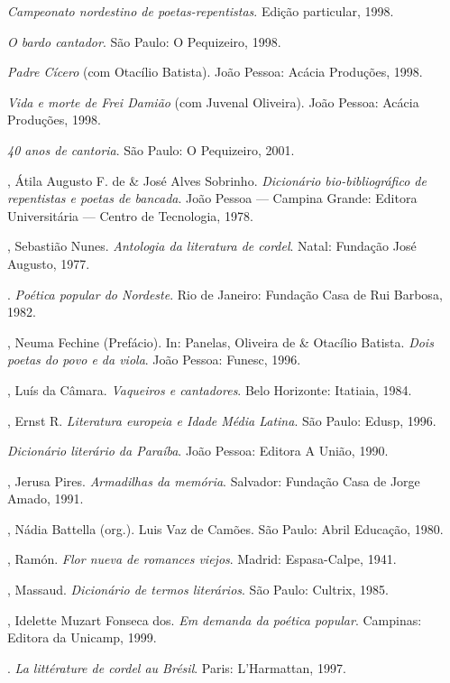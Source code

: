 \begin{bibliografia}[]
\tit{}\textit{Campeonato nordestino de poetas-repentistas}. Edição particular, 1998.

\tit{}\textit{O bardo cantador}. São Paulo: O Pequizeiro, 1998.

\tit{}\textit{Padre Cícero }(com Otacílio Batista). João Pessoa: Acácia Produções, 1998.

\tit{}\textit{Vida e morte de Frei Damião} (com Juvenal Oliveira). João Pessoa: Acácia Produções, 1998.

\tit{}\textit{40 anos de cantoria}. São Paulo: O Pequizeiro, 2001.


\bigskip
{}


, Átila Augusto F. de \& José Alves Sobrinho. \textit{Dicionário bio-bibliográfico de repentistas e poetas de
bancada}. João Pessoa --- Campina Grande: Editora Universitária --- Centro de Tecnologia, 1978.

, Sebastião Nunes. \textit{Antologia da literatura de cordel}. Natal: Fundação José Augusto, 1977.

\titidem. \textit{Poética popular do Nordeste}.  Rio de Janeiro: Fundação Casa de Rui Barbosa, 1982.

, Neuma Fechine (Prefácio). In: Panelas, Oliveira de \& Otacílio Batista. \textit{Dois poetas do povo e da viola}.
João Pessoa: Funesc, 1996.

, Luís da Câmara. \textit{Vaqueiros e cantadores}. Belo Horizonte: Itatiaia, 1984.

, Ernst R. \textit{Literatura europeia e Idade Média Latina}. São Paulo: Edusp, 1996.

\tit{}\textit{Dicionário literário da Paraíba}. João Pessoa: Editora A União, 1990.

, Jerusa Pires. \textit{Armadilhas da memória}. Salvador: Fundação Casa de Jorge Amado, 1991.

, Nádia Battella (org.). Luis Vaz de Camões. São Paulo: Abril Educação, 1980.

, Ramón. \textit{Flor nueva de romances viejos}. Madrid: Espasa-Calpe, 1941.

, Massaud. \textit{Dicionário de termos literários}. São Paulo: Cultrix, 1985.

, Idelette Muzart Fonseca dos. \textit{Em demanda da poética popular}. Campinas: Editora da Unicamp, 1999.

\titidem. \textit{La littérature de cordel au Brésil}. Paris: L'Harmattan, 1997.


\end{bibliografia}
